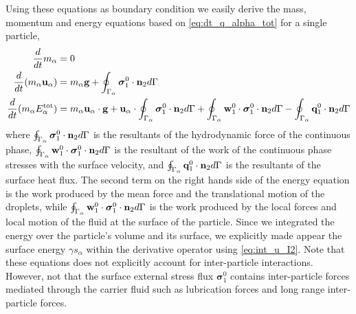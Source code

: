 Using these equations as boundary condition we easily derive the  mass, momentum and energy equations based on \ref{eq:dt_q_alpha_tot}   for a single particle, 
\begin{align}
    \label{eq:dt_m_alpha}
    \frac{d}{dt} m_\alpha
    &= 
    0\\
    \label{eq:dt_p_alpha}
    \frac{d}{dt} (m_\alpha \textbf{u}_\alpha)
    &= 
    m_\alpha\textbf{g}
    +  \oint_{\Gamma_\alpha} \bm{\sigma}_1^0 \cdot \textbf{n}_2 d\Gamma\\
    \label{eq:dt_E_alpha_tot}
    \frac{d}{dt} (m_\alpha E_\alpha^\text{tot})
    &= 
    m_\alpha \textbf{u}_\alpha \cdot \textbf{g}
    +\textbf{u}_\alpha \cdot \oint_{\Gamma_\alpha} \bm{\sigma}_1^0 \cdot \textbf{n}_2 d\Gamma
    +\oint_{\Gamma_\alpha} \textbf{w}_1^0 \cdot \bm{\sigma}_1^0 \cdot  \textbf{n}_2 d\Gamma 
    - \oint_{\Gamma_\alpha} \textbf{q}_1^0 \cdot \textbf{n}_2 d\Gamma
\end{align}
where  $\oint_{\Gamma_\alpha}   \bm{\sigma}_1^0 \cdot \textbf{n}_2  d\Gamma$ is the resultants of the hydrodynamic force of the continuous phase, $\oint_{\Gamma_\alpha} \textbf{w}_1^0 \cdot \bm{\sigma}_1^0 \cdot  \textbf{n}_2 d\Gamma $ is the resultant of the work of the continuous phase stresses with the surface velocity, and $\oint_{\Gamma_\alpha}  \textbf{q}_1^0 \cdot \textbf{n}_2  d\Gamma$ is the resultants of the surface heat flux. 
The second term on the right hands side of the energy equation is the work produced by the mean force and the translational motion of the droplets, while $\oint_{\Gamma_\alpha} \textbf{w}_1^0 \cdot \bm{\sigma}_1^0 \cdot  \textbf{n}_2 d\Gamma$ is the work produced by the local forces and local motion of the fluid at the surface of the particle.
Since we integrated the energy over the particle's volume and its surface, we explicitly made appear the surface energy $\gamma s_\alpha$ within the derivative operator using \ref{eq:int_u_I2}. 
Note that these equations does not explicitly account for inter-particle interactions. 
However, not that the surface external stress flux $\bm{\sigma}_1^0$ contains inter-particle forces mediated through the carrier fluid such as lubrication forces and long range inter-particle forces.

